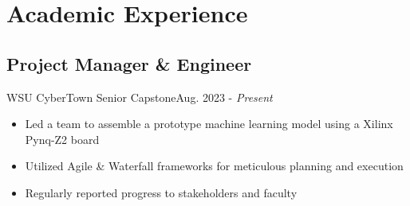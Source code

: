\section{Academic Experience}
\subsection{Project Manager \& Engineer}{WSU CyberTown Senior Capstone}{Aug. 2023 - \textit{Present}}
\begin{itemize}
    \item Led a team to assemble a prototype machine learning model using a Xilinx Pynq-Z2 board
    \item Utilized Agile \& Waterfall frameworks for meticulous planning and execution
    \item Regularly reported progress to stakeholders and faculty
\end{itemize}